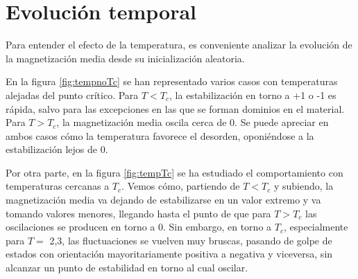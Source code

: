 \documentclass{scrartcl}
\begin{document}
\section{Evolución temporal}
Para entender el efecto de la temperatura, es conveniente analizar la evolución de la magnetización media desde su inicialización aleatoria.\par
En la figura \ref{fig:tempnoTc} se han representado varios casos con temperaturas alejadas del punto crítico. Para $T<T_c$, la estabilización en torno a +1 o -1 es rápida, salvo para las excepciones en las que se forman dominios en el material. Para $T>T_c$, la magnetización media oscila cerca de 0. Se puede apreciar en ambos casos cómo la temperatura favorece el desorden, oponiéndose a la estabilización lejos de 0.\par
Por otra parte, en la figura \ref{fig:tempTc} se ha estudiado el comportamiento con temperaturas cercanas a $T_c$. Vemos cómo, partiendo de $T<T_c$ y subiendo, la magnetización media va dejando de estabilizarse en un valor extremo y va tomando valores menores, llegando hasta el punto de que para $T>T_c$ las oscilaciones se producen en torno a 0. Sin embargo, en torno a $T_c$, especialmente para $T=$ 2,3, las fluctuaciones se vuelven muy bruscas, pasando de golpe de estados con orientación mayoritariamente positiva a negativa y viceversa, sin alcanzar un punto de estabilidad en torno al cual oscilar.
\end{document}
